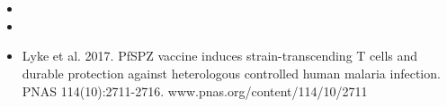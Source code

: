 \section{}
\label{ch_summarizing_data_data}

\begin{itemize}
\setlength{\itemsep}{0mm}
\item[\ref{numericalData}]

\item[\ref{categoricalData}]

\item[\ref{caseStudyMalariaVaccine}]
    Lyke et al. 2017.
    PfSPZ vaccine induces strain-transcending T cells
    and durable protection against heterologous controlled
    human malaria infection.
    PNAS 114(10):2711-2716.
        {www.pnas.org/content/114/10/2711}
\end{itemize}









\section{}
\label{ch_probability_data}

